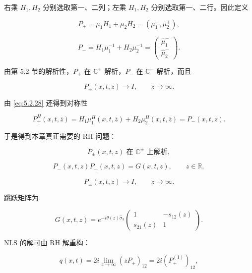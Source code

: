 \documentclass[
    lang=cn,
    scheme=chinese,
    mode=simple,
    device=normal,
    color=blue,
    math=cm,
    thmcnt=section,
    12pt,
    nowatermark
]{elegantbook}
\begin{document}
右乘 $H_1,H_2$ 分别选取第一、二列；左乘 $H_1,H_2$ 分别选取第一、二行。因此定义

\[
    P_+
    =
    \mu_1H_1+\mu_2H_2
    =
    (\mu_1^+,\mu_2^+),
\]

\[
    P_-
    =
    H_1\mu_1^{-1}+H_2\mu_2^{-1}
    =
    \begin{pmatrix}
        \widehat\mu_1^- \\
        \widehat\mu_2^-
    \end{pmatrix}.
\]

由第 5.2 节的解析性，$P_+$ 在 $\mathbb{C}^+$ 解析，$P_-$ 在 $\mathbb{C}^-$ 解析，而且

\[
    P_\pm(x,t,z)\to I,\qquad z\to\infty.
\]

由 \eqref{eq:5.2.28} 还得到对称性

\begin{equation}
    P_+^H(x,t,\bar z)
    =
    H_1\mu_1^H(x,t,\bar z)
    +
    H_2\mu_2^H(x,t,\bar z)
    =
    P_-(x,t,z).
    \tag{5.3.3}
    \label{eq:5.3.3}
\end{equation}

于是得到本章真正需要的 RH 问题：

\begin{equation}
    P_\pm(x,t,z)\text{ 在 }\mathbb{C}^\pm\text{ 上解析},
    \tag{5.3.4}
    \label{eq:5.3.4}
\end{equation}

\begin{equation}
    P_-(x,t,z)P_+(x,t,z)
    =
    G(x,t,z),
    \qquad z\in\mathbb{R},
    \tag{5.3.5}
    \label{eq:5.3.5}
\end{equation}

\begin{equation}
    P_\pm(x,t,z)\to I,
    \qquad z\to\infty.
    \tag{5.3.6}
    \label{eq:5.3.6}
\end{equation}

跳跃矩阵为

\begin{equation}
    G(x,t,z)
    =
    e^{-i\theta(z)\widehat{\sigma}_3}
    \begin{pmatrix}
        1         & -s_{12}(z) \\
        s_{21}(z) & 1
    \end{pmatrix}.
    \tag{5.3.7}
    \label{eq:5.3.7}
\end{equation}

NLS 的解可由 RH 解重构：

\begin{equation}
    q(x,t)
    =
    2i\lim\limits_{z\to\infty}(zP_+)_{12}
    =
    2i(P_+^{(1)})_{12},
    \tag{5.3.8}
    \label{eq:5.3.8}
\end{equation}
\end{document}
